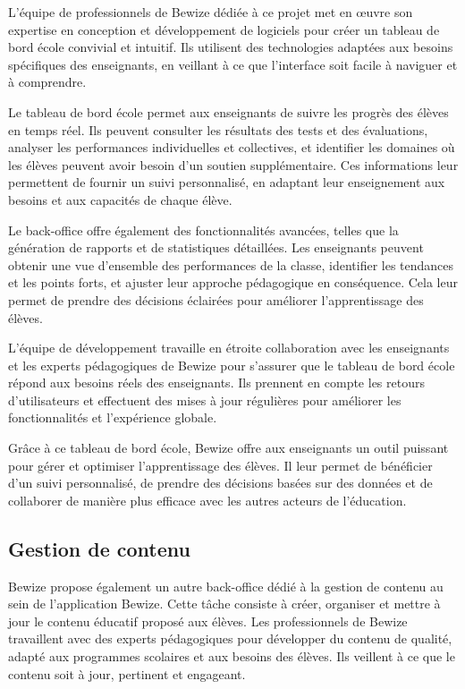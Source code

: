     L'équipe de professionnels de Bewize dédiée à ce projet met en œuvre son expertise en conception et développement de logiciels pour créer un tableau de bord école convivial et intuitif. Ils utilisent des technologies adaptées aux besoins spécifiques des enseignants, en veillant à ce que l'interface soit facile à naviguer et à comprendre.
    
    Le tableau de bord école permet aux enseignants de suivre les progrès des élèves en temps réel. Ils peuvent consulter les résultats des tests et des évaluations, analyser les performances individuelles et collectives, et identifier les domaines où les élèves peuvent avoir besoin d'un soutien supplémentaire. Ces informations leur permettent de fournir un suivi personnalisé, en adaptant leur enseignement aux besoins et aux capacités de chaque élève.
    
    Le back-office offre également des fonctionnalités avancées, telles que la génération de rapports et de statistiques détaillées. Les enseignants peuvent obtenir une vue d'ensemble des performances de la classe, identifier les tendances et les points forts, et ajuster leur approche pédagogique en conséquence. Cela leur permet de prendre des décisions éclairées pour améliorer l'apprentissage des élèves.
    
    L'équipe de développement travaille en étroite collaboration avec les enseignants et les experts pédagogiques de Bewize pour s'assurer que le tableau de bord école répond aux besoins réels des enseignants. Ils prennent en compte les retours d'utilisateurs et effectuent des mises à jour régulières pour améliorer les fonctionnalités et l'expérience globale.
    
    Grâce à ce tableau de bord école, Bewize offre aux enseignants un outil puissant pour gérer et optimiser l'apprentissage des élèves. Il leur permet de bénéficier d'un suivi personnalisé, de prendre des décisions basées sur des données et de collaborer de manière plus efficace avec les autres acteurs de l'éducation.
    
\subsection{Gestion de contenu}
    
    Bewize propose également un autre back-office dédié à la gestion de contenu au sein de l'application Bewize. Cette tâche consiste à créer, organiser et mettre à jour le contenu éducatif proposé aux élèves. Les professionnels de Bewize travaillent avec des experts pédagogiques pour développer du contenu de qualité, adapté aux programmes scolaires et aux besoins des élèves. Ils veillent à ce que le contenu soit à jour, pertinent et engageant.
    
